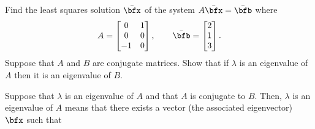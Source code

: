 \begin{questions}
  \question[6] Find the least squares solution $\bar\bfx$ of the system
  $A\bar{\bfx}=\bar{\bfb}$ where
  \[
    A=
    \begin{bmatrix}
      0&1\\
      0&0\\
      -1&0
    \end{bmatrix},
    \qquad
    \bar{\bfb}=
    \begin{bmatrix}
      2\\1\\3
    \end{bmatrix}.
  \]
  \question[4] Suppose that $A$ and $B$ are conjugate matrices. Show that
  if $\lambda$ is an eigenvalue of $A$ then it is an eigenvalue of $B$.
  \begin{solution}
    Suppose that $\lambda$ is an eigenvalue of $A$ and that $A$ is
    conjugate to $B$. Then, $\lambda$ is an eigenvalue of $A$ means that
    there exists a vector (the associated eigenvector) $\bfx$ such that

\end{solution}
\end{questions}
